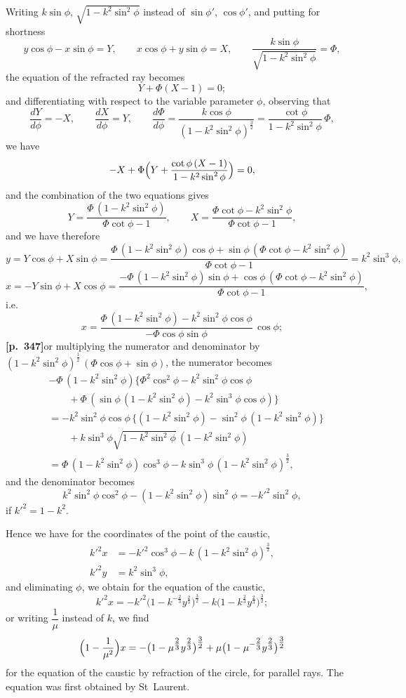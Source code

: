\documentclass[11pt]{article}
\begin{document}
Writing $k\sin\phi$, $\sqrt{1-k^{2}\sin^{2}\phi}$ instead of $\sin\phi'$, $\cos\phi'$, and putting for shortness
\[
y\cos\phi - x\sin\phi = Y,\qquad x\cos\phi + y\sin\phi = X,\qquad \frac{k\sin\phi}{\sqrt{1-k^{2}\sin^{2}\phi}} = \Phi,
\]
the equation of the refracted ray becomes
\[
Y + \Phi(X - 1) = 0;
\]
and differentiating with respect to the variable parameter $\phi$, observing that
\[
\frac{dY}{d\phi} = -X,\qquad \frac{dX}{d\phi} = Y,\qquad \frac{d\Phi}{d\phi} = \frac{k\cos\phi}{(1-k^{2}\sin^{2}\phi)^{\tfrac{3}{2}}} = \frac{\cot\phi}{1-k^{2}\sin^{2}\phi}\,\Phi,
\]
we have
\[
-X + \Phi\Bigl(Y + \frac{\cot\phi\,(X-1)}{1-k^{2}\sin^{2}\phi}\Bigr) = 0,
\]
and the combination of the two equations gives
\[
Y = \frac{\Phi\,(1-k^{2}\sin^{2}\phi)}{\Phi\cot\phi - 1},\qquad X = \frac{\Phi\cot\phi - k^{2}\sin^{2}\phi}{\Phi\cot\phi - 1},
\]
and we have therefore
\[
y = Y\cos\phi + X\sin\phi = \frac{\Phi\,(1-k^{2}\sin^{2}\phi)\cos\phi + \sin\phi\,(\Phi\cot\phi - k^{2}\sin^{2}\phi)}{\Phi\cot\phi - 1} = k^{2}\sin^{3}\phi,
\]
\[
x = -Y\sin\phi + X\cos\phi = \frac{-\Phi\,(1-k^{2}\sin^{2}\phi)\sin\phi + \cos\phi\,(\Phi\cot\phi - k^{2}\sin^{2}\phi)}{\Phi\cot\phi - 1},
\]
i.e.
\[
x = \frac{\Phi\,(1-k^{2}\sin^{2}\phi) - k^{2}\sin^{2}\phi\cos\phi}{-\Phi\cos\phi\sin\phi}\,\cos\phi;
\]
\textbf{[p.~347]}\quad or multiplying the numerator and denominator by $(1-k^{2}\sin^{2}\phi)^{\tfrac{1}{2}}\,(\Phi\cos\phi + \sin\phi)$, the numerator becomes
\begin{align*}
&-\Phi\,(1-k^{2}\sin^{2}\phi)\bigl\{\Phi^{2}\cos^{2}\phi - k^{2}\sin^{2}\phi\cos\phi\\
&\qquad + \Phi\,(\sin\phi\,(1-k^{2}\sin^{2}\phi) - k^{2}\sin^{3}\phi\cos\phi)\bigr\}\\
&= -k^{2}\sin^{2}\phi\cos\phi\,\bigl\{(1-k^{2}\sin^{2}\phi) - \sin^{2}\phi\,(1-k^{2}\sin^{2}\phi)\bigr\}\\
&\qquad + k\sin^{3}\phi\sqrt{1-k^{2}\sin^{2}\phi}\,(1-k^{2}\sin^{2}\phi)\\
&= \Phi\,(1-k^{2}\sin^{2}\phi)\cos^{3}\phi - k\sin^{3}\phi\,(1-k^{2}\sin^{2}\phi)^{\tfrac{3}{2}},
\end{align*}
and the denominator becomes
\[
k^{2}\sin^{2}\phi\cos^{2}\phi - (1-k^{2}\sin^{2}\phi)\sin^{2}\phi = -k'^{2}\sin^{2}\phi,
\]
if $k'^{2} = 1 - k^{2}$.

Hence we have for the coordinates of the point of the caustic,
\begin{align*}
k'^{2}x &= -k'^{2}\cos^{3}\phi - k\,(1-k^{2}\sin^{2}\phi)^{\tfrac{3}{2}},\\
k'^{2}y &= k^{2}\sin^{3}\phi,
\end{align*}
and eliminating $\phi$, we obtain for the equation of the caustic,
\[
k'^{2}x = -k'^{2}\bigl(1 - k^{-\tfrac{2}{3}}y^{\tfrac{2}{3}}\bigr)^{\tfrac{3}{2}} - k\bigl(1 - k^{\tfrac{2}{3}}y^{\tfrac{2}{3}}\bigr)^{\tfrac{3}{2}};
\]
or writing $\dfrac{1}{\mu}$ instead of $k$, we find
\[
\Bigl(1 - \frac{1}{\mu^{2}}\Bigr)x = -\bigl(1 - \mu^{\tfrac{2}{3}}y^{\tfrac{2}{3}}\bigr)^{\tfrac{3}{2}} + \mu\bigl(1 - \mu^{-\tfrac{2}{3}}y^{\tfrac{2}{3}}\bigr)^{\tfrac{3}{2}}
\]
for the equation of the caustic by refraction of the circle, for parallel rays. The equation was first obtained by St~Laurent.
\end{document}
